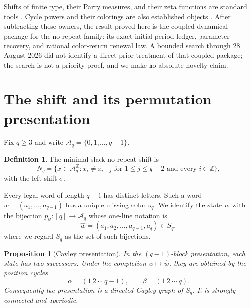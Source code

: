 \documentclass[11pt,a4paper]{amsart}
\newtheorem{proposition}[theorem]{Proposition}
\theoremstyle{definition}
\newtheorem{definition}[theorem]{Definition}
\theoremstyle{remark}
\newcommand{\Z}{\mathbb Z}
\begin{document}
Shifts of finite type, their Parry measures, and their zeta functions are
standard tools \cite{LindMarcus1995,Parry1964}.  Cycle powers and their
colorings are also established objects \cite{ProwseWoodall2003}.  After
subtracting those owners, the result proved here is the coupled dynamical
package for the no-repeat family: its exact initial period ledger, parameter
recovery, and rational color-return renewal law.  A bounded search through
28 August 2026 did not identify a direct prior treatment of that coupled
package; the search is not a priority proof, and we make no absolute novelty
claim.

\section{The shift and its permutation presentation}

Fix $q\geq3$ and write $\mathcal A_q=\{0,1,\ldots,q-1\}$.

\begin{definition}
The minimal-slack no-repeat shift is
\[
 N_q=\{x\in\mathcal A_q^{\Z}:x_i\neq x_{i+j}
       \text{ for }1\leq j\leq q-2\text{ and every }i\in\Z\},
\]
with the left shift $\sigma$.
\end{definition}

Every legal word of length $q-1$ has distinct letters.  Such a word
$w=(a_1,\ldots,a_{q-1})$ has a unique missing color $a_q$.  We identify the
state $w$ with the bijection $p_w:[q]\to\mathcal A_q$ whose one-line notation is
\[
 \widehat w=(a_1,a_2,\ldots,a_{q-1},a_q)\in S_q,
\]
where we regard $S_q$ as the set of such bijections.

\begin{proposition}[Cayley presentation]\label{prop:cayley}
In the $(q-1)$-block presentation, each state has two successors.  Under the
completion $w\mapsto\widehat w$, they are obtained by the position cycles
\[
 \alpha=(1\ 2\ \cdots\ q-1),\qquad
 \beta=(1\ 2\ \cdots\ q).
\]
Consequently the presentation is a directed Cayley graph of $S_q$.
It is strongly connected and aperiodic.
\end{proposition}
\end{document}

